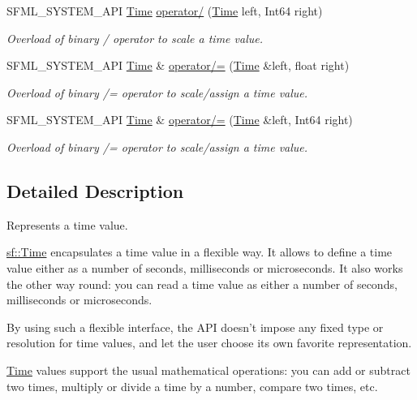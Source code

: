 \begin{DoxyCompactItemize}
S\+F\+M\+L\+\_\+\+S\+Y\+S\+T\+E\+M\+\_\+\+A\+P\+I \hyperlink{classsf_1_1_time}{Time} \hyperlink{classsf_1_1_time_ab72f2de3e2bb592b4b4008dc1ac79056}{operator/} (\hyperlink{classsf_1_1_time}{Time} left, Int64 right)
\begin{DoxyCompactList}\small\item\em Overload of binary / operator to scale a time value. \end{DoxyCompactList}\item 
S\+F\+M\+L\+\_\+\+S\+Y\+S\+T\+E\+M\+\_\+\+A\+P\+I \hyperlink{classsf_1_1_time}{Time} \& \hyperlink{classsf_1_1_time_a9835490c54cab06492ec3aa9e9275ef9}{operator/=} (\hyperlink{classsf_1_1_time}{Time} \&left, float right)
\begin{DoxyCompactList}\small\item\em Overload of binary /= operator to scale/assign a time value. \end{DoxyCompactList}\item 
S\+F\+M\+L\+\_\+\+S\+Y\+S\+T\+E\+M\+\_\+\+A\+P\+I \hyperlink{classsf_1_1_time}{Time} \& \hyperlink{classsf_1_1_time_ad51871e3db77def834ae8688e64504ff}{operator/=} (\hyperlink{classsf_1_1_time}{Time} \&left, Int64 right)
\begin{DoxyCompactList}\small\item\em Overload of binary /= operator to scale/assign a time value. \end{DoxyCompactList}\end{DoxyCompactItemize}


\subsection{Detailed Description}
Represents a time value. 

\hyperlink{classsf_1_1_time}{sf\+::\+Time} encapsulates a time value in a flexible way. It allows to define a time value either as a number of seconds, milliseconds or microseconds. It also works the other way round\+: you can read a time value as either a number of seconds, milliseconds or microseconds.

By using such a flexible interface, the A\+P\+I doesn't impose any fixed type or resolution for time values, and let the user choose its own favorite representation.

\hyperlink{classsf_1_1_time}{Time} values support the usual mathematical operations\+: you can add or subtract two times, multiply or divide a time by a number, compare two times, etc.

